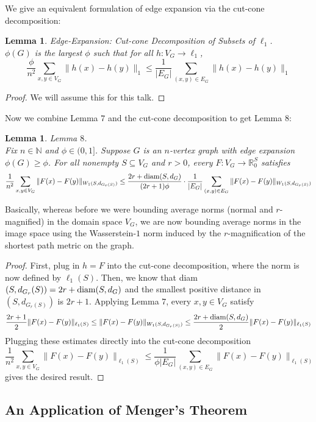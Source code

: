 \documentclass[10pt]{article}
\newtheorem{lemma}[theorem]{Lemma}
\theoremstyle{definition}
\theoremstyle{definition}
\theoremstyle{definition}
\theoremstyle{definition}
\newcommand{\N}
{\mathbb{N}}
\newcommand{\R}
{\mathbb{R}}
\newcommand{\txt}[1]
{\textnormal{#1}}
\begin{document}
We give an equivalent formulation of edge expansion via the cut-cone decomposition:
\begin{lemma} Edge-Expansion: Cut-cone Decomposition of Subsets of $\ell_1$. \\
$\phi(G)$ is the largest $\phi$ such that for all $h:V_G \to \ell_1$,
\[
\frac{\phi}{n^2}\sum_{x, y \in V_G} \|h(x) - h(y)\|_1 \leq \frac{1}{|E_G|}\sum_{(x, y) \in E_G} \|h(x) - h(y)\|_1
\]
\end{lemma}
\begin{proof}
We will assume this for this talk.
\end{proof}

Now we combine Lemma $7$ and the cut-cone decomposition to get Lemma $8$:
\begin{lemma} Lemma $8$. \\
Fix $n \in \N$ and $\phi \in (0, 1]$. Suppose $G$ is an $n$-vertex graph with edge expansion $\phi(G) \geq \phi$. For all nonempty $S \subseteq V_G$ and $r > 0$, every $F:V_G \to \R_0^S$ satisfies
\[
\frac{1}{n^2}\sum_{x, y \in V_G} \|F(x) - F(y)\|_{W_1(S, d_{G_r(S)})} \leq \frac{2r + \txt{diam}(S, d_G)}{(2r + 1)\phi} \cdot \frac{1}{|E_G|} \sum_{(x, y) \in E_G}\|F(x) - F(y)\|_{W_1(S, d_{G_r(S)})}
\]
\end{lemma}
Basically, whereas before we were bounding average norms (normal and $r$-magnified) in the domain space $V_G$, we are now bounding average norms in the image space using the Wasserstein-$1$ norm induced by the $r$-magnification of the shortest path metric on the graph.
\begin{proof}
First, plug in $h = F$ into the cut-cone decomposition, where the norm is now defined by $\ell_1(S)$. Then, we know that diam$(S, d_{G_r}(S)) = 2r + \txt{diam}(S, d_G)$ and the smallest positive distance in $(S, d_{G_r(S)})$ is $2r + 1$. Applying Lemma $7$, every $x, y \in V_G$ satisfy
\[
\frac{2r + 1}{2}\|F(x) - F(y)\|_{\ell_1(S)} \leq \|F(x) - F(y)\|_{W_1(S, d_{G_r(S)})} \leq \frac{2r + \txt{diam}(S, d_G)}{2}\|F(x) - F(y)\|_{\ell_1(S)}
\]
Plugging these estimates directly into the cut-cone decomposition
\[
\frac{1}{n^2}\sum_{x, y \in V_G} \|F(x) - F(y)\|_{\ell_1(S)} \leq \frac{1}{\phi|E_G|}\sum_{(x, y) \in E_G} \|F(x) - F(y)\|_{\ell_1(S)}
\]
gives the desired result.
\end{proof}

\subsection{An Application of Menger's Theorem}
\end{document}
